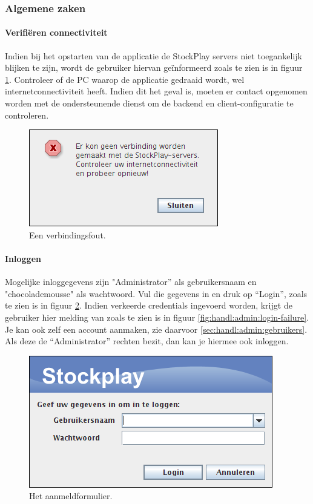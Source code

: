 \subsubsection{Algemene zaken}
\label{sec:handl:admin:algemeen}

\paragraph{Verifi\"eren connectiviteit}

Indien bij het opstarten van de applicatie de StockPlay servers niet toegankelijk blijken te zijn, wordt de gebruiker hiervan ge\"informeerd zoals te zien is in figuur \ref{fig:handl:admin:verbindingsfout}. Controleer of de PC waarop de applicatie gedraaid wordt, wel internetconnectiviteit heeft. Indien dit het geval is, moeten er contact opgenomen worden met de ondersteunende dienst om de backend en client-configuratie te controleren.

\begin{figure}[h!]
	\centering
		\includegraphics[scale=0.75]{images/handleiding/administratie/verbindingsfout}
	\caption{Een verbindingsfout.}
	\label{fig:handl:admin:verbindingsfout}
\end{figure}

\paragraph{Inloggen}

Mogelijke inloggegevens zijn "Administrator'' als gebruikersnaam en "chocolademousse" als wachtwoord. Vul die gegevens in en druk op ``Login'', zoals te zien is in figuur \ref{fig:handl:admin:login}. Indien verkeerde credentials ingevoerd worden, krijgt de gebruiker hier melding van zoals te zien is in figuur \ref{fig:handl:admin:login-failure}.
Je kan ook zelf een account aanmaken, zie daarvoor \ref{sec:handl:admin:gebruikers}. Als deze de ``Administrator'' rechten bezit, dan kan je hiermee ook inloggen.

\begin{figure}[h!]
	\centering
		\includegraphics[scale=0.75]{images/handleiding/administratie/login}
	\caption{Het aanmeldformulier.}
	\label{fig:handl:admin:login}
\end{figure}


